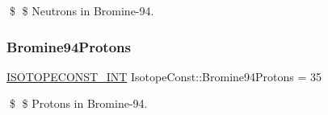 \$ \$ Neutrons in Bromine-\/94. \mbox{\label{group___isotope_const-_bromine-_br94_gadeed23a9516cc03999644e0c0441b16b}} 
\subsubsection{\texorpdfstring{Bromine94\+Protons}{Bromine94Protons}}
{\footnotesize\ttfamily \mbox{\hyperlink{group___isotope_const-_macros_ga5f18360b3e99483a35c32d789e62621c}{I\+S\+O\+T\+O\+P\+E\+C\+O\+N\+S\+T\+\_\+\+I\+NT}} Isotope\+Const\+::\+Bromine94\+Protons = 35}

\$ \$ Protons in Bromine-\/94. 